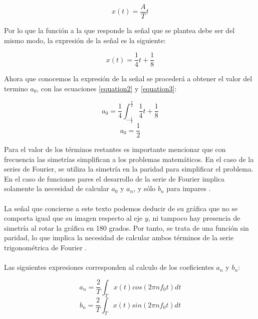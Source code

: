 \documentclass[12pt]{article}
\begin{document}
    \begin{equation*}
        x(t)=\frac{A}{T} t
    \end{equation*}

    Por lo que la función a la que responde la señal que se plantea debe ser del mismo modo, la expresión 
    de la señal es la siguiente:

    \begin{equation}
        x(t)=\frac{1}{4} t+\frac{1}{8}
        \label{equation3}
    \end{equation}

    Ahora que conocemos la expresión de la señal se procederá a obtener el valor del termino $a_{0}$, con las 
    ecuaciones \ref{equation2} y \ref{equation3}:

    \begin{equation*}
        a_{0}=\frac{1}{4} \int_{-\frac{1}{2}}^{\frac{7}{2}} \frac{1}{4} t+\frac{1}{8}
    \end{equation*}
    \begin{equation}
        a_{0}=\frac{1}{2}
        \label{equation4}
    \end{equation}    

    Para el valor de los términos restantes es importante mencionar que con frecuencia las simetrías simplifican 
    a los problemas matemáticos. En el caso de la series de Fourier, se utiliza la simetría en la paridad para 
    simplificar el problema. En el caso de funciones pares el desarrollo de la serie de Fourier implica solamente 
    la necesidad de calcular $a_{0}$ y $a_{n}$, y sólo $b_{n}$ para impares \cite{parimpar}.\\
    \\
    La señal que concierne a este texto podemos deducir de su gráfica que no se comporta igual que su imagen respecto 
    al eje $y$, ni tampoco hay presencia de simetría al rotar la gráfica en 180 grados. Por tanto, se trata de una 
    función sin paridad, lo que implica la necesidad de calcular ambos términos de la serie trigonométrica de Fourier .\\
    \\
    Las siguientes expresiones corresponden al calculo de los coeficientes $a_{n}$ y $b_{n}$:

    \begin{equation}
        a_{n}=\frac{2}{T} \int_{T} x(t)cos(2\pi nf_{0}t)dt
        \label{equation5}
    \end{equation}
    \begin{equation}
        b_{n}=\frac{2}{T} \int_{T} x(t)sin(2\pi nf_{0}t)dt
        \label{equation6}
    \end{equation}
\end{document}
